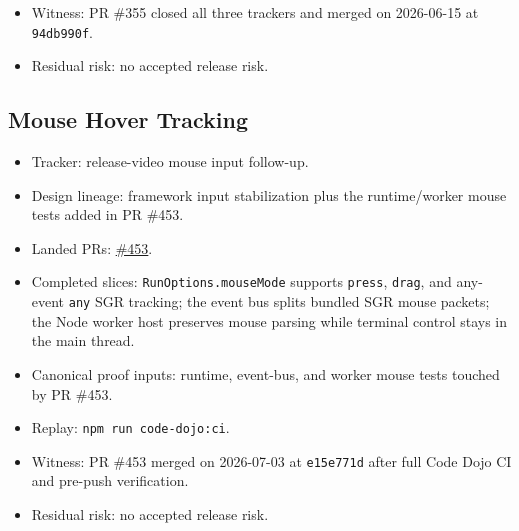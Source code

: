 \begin{itemize}
\item
  Witness: PR \#355 closed all three trackers and merged on 2026-06-15 at \texttt{9\allowbreak{}4\allowbreak{}d\allowbreak{}b\allowbreak{}9\allowbreak{}9\allowbreak{}0\allowbreak{}f}.
\item
  Residual risk: no accepted release risk.
\end{itemize}

\subsection{Mouse Hover Tracking}\label{record-261-mouse-hover-tracking}

\begin{itemize}
\tightlist
\item
  Tracker: release-video mouse input follow-up.
\item
  Design lineage: framework input stabilization plus the runtime/worker mouse tests added in PR \#453.
\item
  Landed PRs: \href{https://github.com/flyingrobots/bijou/pull/453}{\#453}.
\item
  Completed slices: \texttt{R\allowbreak{}u\allowbreak{}n\allowbreak{}O\allowbreak{}p\allowbreak{}t\allowbreak{}i\allowbreak{}o\allowbreak{}n\allowbreak{}s\allowbreak{}.\allowbreak{}m\allowbreak{}o\allowbreak{}u\allowbreak{}s\allowbreak{}e\allowbreak{}M\allowbreak{}o\allowbreak{}d\allowbreak{}e} supports \texttt{p\allowbreak{}r\allowbreak{}e\allowbreak{}s\allowbreak{}s}, \texttt{d\allowbreak{}r\allowbreak{}a\allowbreak{}g}, and any-event \texttt{a\allowbreak{}n\allowbreak{}y} SGR tracking; the event bus splits bundled SGR mouse packets; the Node worker host preserves mouse parsing while terminal control stays in the main thread.
\item
  Canonical proof inputs: runtime, event-bus, and worker mouse tests touched by PR \#453.
\item
  Replay: \texttt{n\allowbreak{}p\allowbreak{}m\allowbreak{} \allowbreak{}r\allowbreak{}u\allowbreak{}n\allowbreak{} \allowbreak{}c\allowbreak{}o\allowbreak{}d\allowbreak{}e\allowbreak{}-\allowbreak{}d\allowbreak{}o\allowbreak{}j\allowbreak{}o\allowbreak{}:\allowbreak{}c\allowbreak{}i}.
\item
  Witness: PR \#453 merged on 2026-07-03 at \texttt{e\allowbreak{}1\allowbreak{}5\allowbreak{}e\allowbreak{}7\allowbreak{}7\allowbreak{}1\allowbreak{}d} after full Code Dojo CI and pre-push verification.
\item
  Residual risk: no accepted release risk.
\end{itemize}

